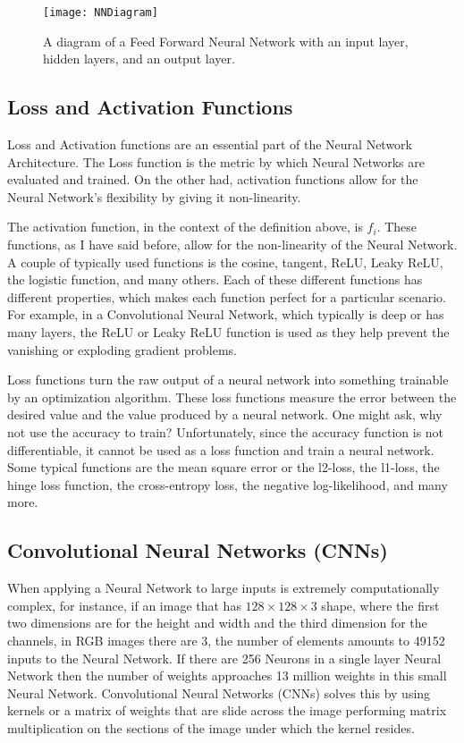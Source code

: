 \begin{figure}
	\centering
	\texttt{[image: NNDiagram]}
	\caption{A diagram of a Feed Forward Neural Network with an input layer, hidden layers, and an output layer.}
	\label{fig:NNDiagram}
\end{figure}

\subsection{Loss and Activation Functions}

Loss and Activation functions are an essential part of the Neural Network Architecture. The Loss function is the metric by which Neural Networks are evaluated and trained. On the other had, activation functions allow for the Neural Network's flexibility by giving it non-linearity.

The activation function, in the context of the definition above, is $f_i$. These functions, as I have said before, allow for the non-linearity of the Neural Network. A couple of typically used functions is the cosine, tangent, ReLU, Leaky ReLU, the logistic function, and many others. Each of these different functions has different properties, which makes each function perfect for a particular scenario. For example, in a Convolutional Neural Network, which typically is deep or has many layers, the ReLU or Leaky ReLU function is used as they help prevent the vanishing or exploding gradient problems.

Loss functions turn the raw output of a neural network into something trainable by an optimization algorithm. These loss functions measure the error between the desired value and the value produced by a neural network. One might ask, why not use the accuracy to train? Unfortunately, since the accuracy function is not differentiable, it cannot be used as a loss function and train a neural network. Some typical functions are the mean square error or the l2-loss, the l1-loss, the hinge loss function, the cross-entropy loss, the negative log-likelihood, and many more.

\subsection{Convolutional Neural Networks (CNNs)}

When applying a Neural Network to large inputs is extremely computationally complex, for instance, if an image that has $128\times 128\times 3$ shape, where the first two dimensions are for the height and width and the third dimension for the channels, in RGB images there are 3, the number of elements amounts to 49152 inputs to the Neural Network. If there are 256 Neurons in a single layer Neural Network then the number of weights approaches 13 million weights in this small Neural Network. Convolutional Neural Networks (CNNs) solves this by using kernels or a matrix of weights that are slide across the image performing matrix multiplication on the sections of the image under which the kernel resides.

